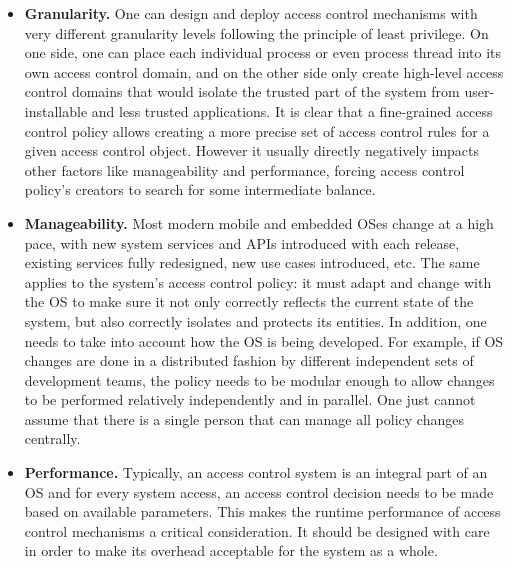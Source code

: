 \begin{itemize}
	\item \textbf{Granularity.} One can design and deploy access control mechanisms with very different granularity levels following the principle of least privilege. On one side, one can place each individual process or even process thread into its own access control domain, and on the other side only create high-level access control domains that would isolate the trusted part of the system from user-installable and less trusted applications. It is clear that a fine-grained access control policy allows creating a more precise set of access control rules for a given access control object. However it usually directly negatively impacts other factors like manageability and performance, forcing access control policy's creators to search for some intermediate balance.
	\item \textbf{Manageability.} Most modern mobile and embedded OSes change at a high pace, with new system services and APIs introduced with each release, existing services fully redesigned, new use cases introduced, etc. The same applies to the system's access control policy: it must adapt and change with the OS to make sure it not only correctly reflects the current state of the system, but also correctly isolates and protects its entities. In addition, one needs to take into account how the OS is being developed. For example, if OS changes are done in a distributed fashion by different independent sets of development teams, the policy needs to be modular enough to allow changes to be performed relatively independently and in parallel. One just cannot assume that there is a single person that can manage all policy changes centrally.  
	\item \textbf{Performance.} Typically, an access control system is an integral part of an OS and for every system access, an access control decision needs to be made based on available parameters. This makes the runtime performance of access control mechanisms a critical consideration. It should be designed with care in order to make its overhead acceptable for the system as a whole.  
\end{itemize}

